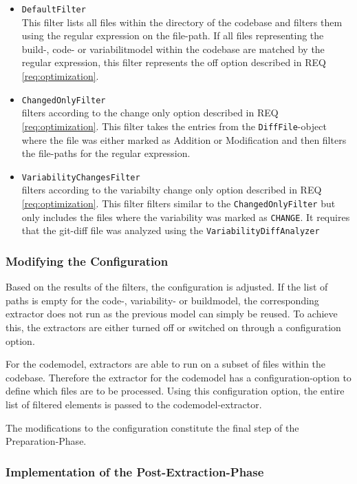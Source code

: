 \documentclass[a4paper]{article}
\begin{document}
\begin{itemize}
\item \texttt{DefaultFilter} \\
    This filter lists all files within the directory of the codebase and filters them using the regular expression on the file-path. If all files representing  the build-, code- or variabilitmodel within the codebase are matched by the regular expression, this filter represents the off option described in REQ \ref{req:optimization}.
\item \texttt{ChangedOnlyFilter} \\
    filters according to the change only option described in REQ \ref{req:optimization}. This filter takes the entries from the \texttt{DiffFile}-object where the file was either marked as Addition or Modification and then filters the file-paths for the regular expression.
\item \texttt{VariabilityChangesFilter} \\
    filters according to the variabilty change only option described in REQ \ref{req:optimization}. This filter filters similar to the \texttt{ChangedOnlyFilter} but only includes the files where the variability was marked as \texttt{CHANGE}. It requires that the git-diff file was analyzed using the \texttt{VariabilityDiffAnalyzer}
\end{itemize}

\subsubsection{Modifying the Configuration}

Based on the results of the filters, the configuration is adjusted. If the list of paths is empty for the code-, variability- or buildmodel, the corresponding extractor does not run as the previous model can simply be reused. To achieve this, the extractors are either turned off or switched on through a configuration option. 

For the codemodel, extractors are able to run on a subset of files within the codebase. Therefore the extractor for the codemodel has a configuration-option to define which files are to be processed. Using this configuration option, the entire list of filtered elements is passed to the codemodel-extractor.

The modifications to the configuration constitute the final step of the Preparation-Phase.

\subsubsection{Implementation of the Post-Extraction-Phase}
\end{document}

